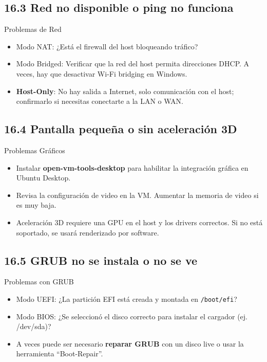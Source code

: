 \documentclass{beamer}
\begin{document}
\subsection{16.3 Red no disponible o ping no funciona}
\begin{frame}{Problemas de Red}
    \begin{itemize}
        \item Modo NAT: ¿Está el firewall del host bloqueando tráfico?
        \item Modo Bridged: Verificar que la red del host permita direcciones DHCP. A veces, hay que desactivar Wi-Fi bridging en Windows.
        \item \textbf{Host-Only}: No hay salida a Internet, solo comunicación con el host; confirmarlo si necesitas conectarte a la LAN o WAN.
    \end{itemize}
\end{frame}

\subsection{16.4 Pantalla pequeña o sin aceleración 3D}
\begin{frame}{Problemas Gráficos}
    \begin{itemize}
        \item Instalar \textbf{open-vm-tools-desktop} para habilitar la integración gráfica en Ubuntu Desktop.
        \item Revisa la configuración de video en la VM. Aumentar la memoria de video si es muy baja.
        \item Aceleración 3D requiere una GPU en el host y los drivers correctos. Si no está soportado, se usará renderizado por software.
    \end{itemize}
\end{frame}

\subsection{16.5 GRUB no se instala o no se ve}
\begin{frame}{Problemas con GRUB}
    \begin{itemize}
        \item Modo UEFI: ¿La partición EFI está creada y montada en \texttt{/boot/efi}?
        \item Modo BIOS: ¿Se seleccionó el disco correcto para instalar el cargador (ej. /dev/sda)?
        \item A veces puede ser necesario \textbf{reparar GRUB} con un disco live o usar la herramienta “Boot-Repair”.
    \end{itemize}
\end{frame}
\end{document}
